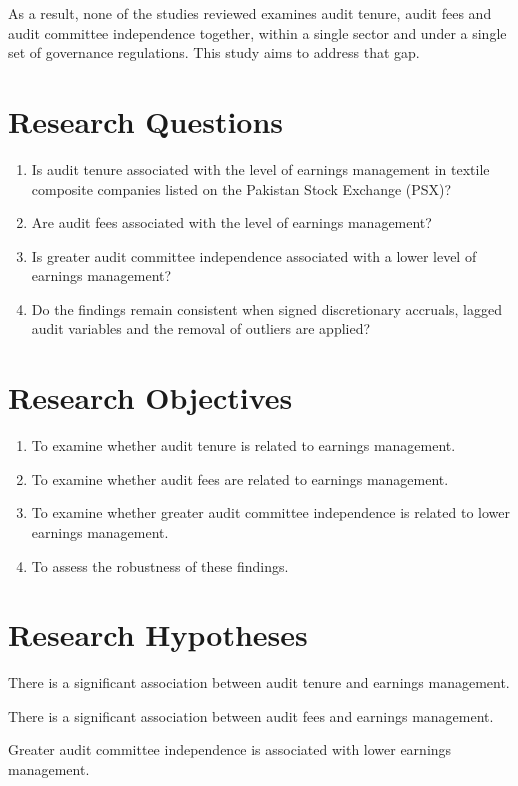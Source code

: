 As a result, none of the studies reviewed examines audit tenure, audit fees and audit committee independence together, within a single sector and under a single set of governance regulations. This study aims to address that gap.

\section{Research Questions}

\begin{enumerate}[label=\arabic*.]
  \item Is audit tenure associated with the level of earnings management in textile composite companies listed on the Pakistan Stock Exchange (PSX)?
  \item Are audit fees associated with the level of earnings management?
  \item Is greater audit committee independence associated with a lower level of earnings management?
  \item Do the findings remain consistent when signed discretionary accruals, lagged audit variables and the removal of outliers are applied?
\end{enumerate}

\section{Research Objectives}

\begin{enumerate}[label=\arabic*.]
  \item To examine whether audit tenure is related to earnings management.
  \item To examine whether audit fees are related to earnings management.
  \item To examine whether greater audit committee independence is related to lower earnings management.
  \item To assess the robustness of these findings.
\end{enumerate}

\section{Research Hypotheses}

\begin{description}[labelwidth=1cm,leftmargin=1.5cm,style=sameline]
  \item[H1:] There is a significant association between audit tenure and earnings management.
  \item[H2:] There is a significant association between audit fees and earnings management.
  \item[H3:] Greater audit committee independence is associated with lower earnings management.
\end{description}

